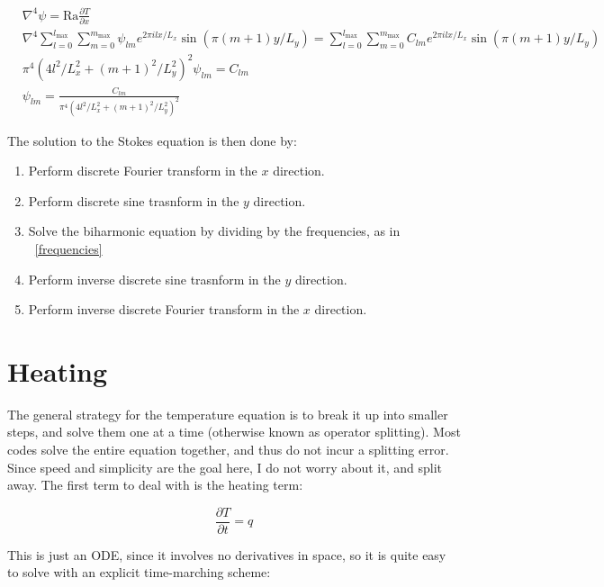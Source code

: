 \documentclass[a4paper,10pt]{article}
\begin{document}
\begin{equation}
\begin{aligned}
 &\nabla^4 \psi = \mathrm{Ra} \frac{\partial{T}}{\partial x} \\
 &\nabla^4 \displaystyle \sum_{l=0}^{l_{\mathrm{max}}} \sum_{m=0}^{m_{\mathrm{max}}} \psi_{lm}  e^{2 \pi i l x/L_x} \sin( \pi (m+1) y/L_y)  =
 \displaystyle \sum_{l=0}^{l_{\mathrm{max}}} \sum_{m=0}^{m_{\mathrm{max}}} C_{lm}  e^{2 \pi i l x/L_x} \sin( \pi (m+1) y/L_y)  \\
 &{\pi^4\left(4 l^2/L_x^2 + (m+1)^2 / L_y^2 \right)^2} \psi_{lm} = C_{lm} \\
 &\psi_{lm} =  \frac{C_{lm} }{\pi^4\left(4 l^2/L_x^2 +(m+1)^2 / L_y^2 \right)^2}
\end{aligned}
\label{frequencies}
\end{equation}

The solution to the Stokes equation is then done by:
\begin{enumerate}
\item Perform discrete Fourier transform in the $x$ direction.
\item Perform discrete sine trasnform in the $y$ direction.
\item Solve the biharmonic equation by dividing by the frequencies, as in ~\ref{frequencies}
\item Perform inverse discrete sine trasnform in the $y$ direction.
\item Perform inverse discrete Fourier transform in the $x$ direction.
\end{enumerate}


\section{Heating}

The general strategy for the temperature equation is to break it up into smaller steps, and solve them one at a time (otherwise known as operator splitting). 
Most codes solve the entire equation together, and thus do not incur a splitting error.  
Since speed and simplicity are the goal here, I do not worry about it, and split away.  The first term to deal with is the heating term:

\begin{equation}
\frac{\partial T}{\partial t} = q
\end{equation}

This is just an ODE, since it involves no derivatives in space, so it is quite easy to solve with an explicit time-marching scheme:
\end{document}
